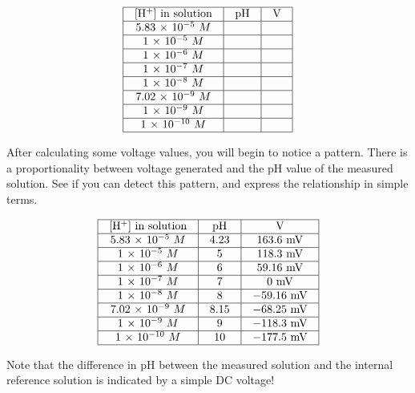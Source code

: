 $$\vbox{\offinterlineskip
\halign{\strut
\vrule \quad\hfil # \ \hfil & 
\vrule \quad\hfil # \ \hfil & 
\vrule \quad\hfil # \ \hfil \vrule \cr
\noalign{\hrule}
%
[H$^{+}$] in solution & pH & V \cr
%
\noalign{\hrule}
%
5.83 $\times$ $10^{-5}$ $M$ &  &  \cr
%
\noalign{\hrule}
%
1 $\times$ $10^{-5}$ $M$ &  &  \cr
%
\noalign{\hrule}
%
1 $\times$ $10^{-6}$ $M$ &  &  \cr
%
\noalign{\hrule}
%
1 $\times$ $10^{-7}$ $M$ &  &  \cr
%
\noalign{\hrule}
%
1 $\times$ $10^{-8}$ $M$ &  &  \cr
%
\noalign{\hrule}
%
7.02 $\times$ $10^{-9}$ $M$ &  &  \cr
%
\noalign{\hrule}
%
1 $\times$ $10^{-9}$ $M$ &  &  \cr
%
\noalign{\hrule}
%
1 $\times$ $10^{-10}$ $M$ &  &  \cr
%
\noalign{\hrule}
} %
}$$ %

After calculating some voltage values, you will begin to notice a pattern.  There is a proportionality between voltage generated and the pH value of the measured solution.  See if you can detect this pattern, and express the relationship in simple terms.








$$\vbox{\offinterlineskip
\halign{\strut
\vrule \quad\hfil # \ \hfil & 
\vrule \quad\hfil # \ \hfil & 
\vrule \quad\hfil # \ \hfil \vrule \cr
\noalign{\hrule}
%
[H$^{+}$] in solution & pH & V \cr
%
\noalign{\hrule}
%
5.83 $\times$ $10^{-5}$ $M$ & 4.23 & 163.6 mV \cr
%
\noalign{\hrule}
%
1 $\times$ $10^{-5}$ $M$ & 5 & 118.3 mV \cr
%
\noalign{\hrule}
%
1 $\times$ $10^{-6}$ $M$ & 6 & 59.16 mV \cr
%
\noalign{\hrule}
%
1 $\times$ $10^{-7}$ $M$ & 7 & 0 mV \cr
%
\noalign{\hrule}
%
1 $\times$ $10^{-8}$ $M$ & 8 & $-59.16$ mV \cr
%
\noalign{\hrule}
%
7.02 $\times$ $10^{-9}$ $M$ & 8.15 & $-68.25$ mV \cr
%
\noalign{\hrule}
%
1 $\times$ $10^{-9}$ $M$ & 9 & $-118.3$ mV \cr
%
\noalign{\hrule}
%
1 $\times$ $10^{-10}$ $M$ & 10 & $-177.5$ mV \cr
%
\noalign{\hrule}
} %
}$$ %

Note that the difference in pH between the measured solution and the internal reference solution is indicated by a simple DC voltage!

